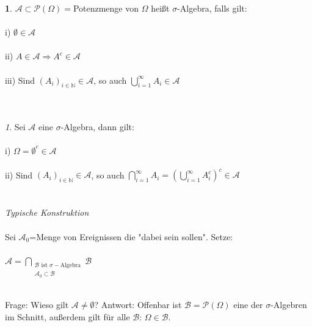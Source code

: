 \documentclass[10pt,a4paper]{report}
\numberwithin{equation}{section}
\numberwithin{figure}{section}
\theoremstyle{plain}
\theoremstyle{definition}
\newtheorem{defn}{\protect\definitionname}[section]
\theoremstyle{plain}
\theoremstyle{definition}
\theoremstyle{remark}
\newtheorem{rem}{\protect\remarkname}[section]
\theoremstyle{plain}
\theoremstyle{plain}
\theoremstyle{plain}
\theoremstyle{plain}
\theoremstyle{plain}
\providecommand{\definitionname}{Definition}
\providecommand{\remarkname}{Bemerkung}
\newcommand{\1}{ \mathbb{1} } %
\begin{document}
\begin{defn}
  $\mathcal{A}\subset \mathcal{P}(\Omega)=$Potenzmenge von $\Omega$ heißt $\sigma$-Algebra, falls gilt:\\\\
  i) $\emptyset \in \mathcal{A}$\\\\
  ii) $A\in \mathcal{A} \Rightarrow A^c \in \mathcal{A}$\\\\
  iii) Sind $(A_i)_{i \in \mathbb{N}} \in \mathcal{A}$, so auch $\bigcup\limits_{i=1}^\infty A_i \in \mathcal{A}$\\\\\\
\end{defn}
\begin{rem}
  Sei $\mathcal{A}$ eine $\sigma$-Algebra, dann gilt:\\\\
  i) $\Omega=\emptyset^c \in \mathcal{A}$\\\\
  ii) Sind $(A_i)_{i \in \mathbb{N}} \in \mathcal{A}$, so auch $\bigcap\limits_{i=1}^\infty A_i=\left(\bigcup\limits_{i=1}^\infty A_i^c\right)^c \in \mathcal{A}$\\\\\\
  \textit{Typische Konstruktion}\\\\
  Sei $\mathcal{A}_0$=Menge von Ereignissen die "dabei sein sollen". Setze:\\\\
  $\mathcal{A}=\bigcap\limits_{\substack{\mathcal{B} \text{ ist }  \sigma-\text{Algebra}\\ \mathcal{A}_0\subset \mathcal{B}}}\mathcal{B}$\\\\
\end{rem}
Frage: Wieso gilt $\mathcal{A}\neq \emptyset$? Antwort: Offenbar ist $\mathcal{B}=\mathcal{P}(\Omega)$ eine der $\sigma$-Algebren im Schnitt, außerdem gilt für alle $\mathcal{B}$: $\Omega \in \mathcal{B}$.\\\\\\
\end{document}
